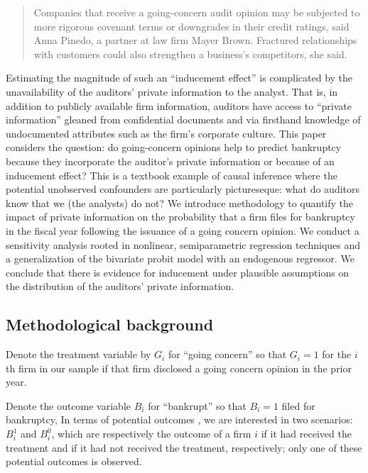 \documentclass[aoas,preprint, 11pt, dvipsnames, table, x11name]{imsart}
\theoremstyle{remark}
\begin{document}
	\begin{quote}
		Companies that receive a going-concern audit opinion may be subjected to more rigorous covenant terms or downgrades in their credit ratings, said Anna Pinedo, a partner at law firm Mayer Brown. Fractured relationships with customers could also strengthen a business’s competitors, she said.
	\end{quote}
	
	Estimating the magnitude of such an ``inducement effect'' is complicated by the unavailability of the auditors' private information to the analyst. That is, in addition to publicly available firm information, auditors have access to ``private information'' gleaned from confidential documents and via firsthand knowledge of undocumented attributes such as the firm's corporate culture. This paper considers the question: do going-concern opinions help to predict bankruptcy because they incorporate the auditor's private information or because of an inducement effect? This is a textbook example of causal inference where the potential unobserved confounders are particularly pictureseque: what do auditors know that we (the analysts) do not? We introduce methodology to quantify the impact of private information on the probability that a firm files for bankruptcy in the fiscal year following the issuance of a going concern opinion.  We conduct a sensitivity analysis rooted in nonlinear, semiparametric regression techniques and a generalization of the bivariate probit model with an endogenous regressor. We conclude that there is evidence for inducement under plausible assumptions on the distribution of the auditors' private information.
	
	
	\subsection{Methodological background}
	
	Denote the treatment variable by $G_i$ for ``going concern'' so that $G_i = 1$ for the $i$th firm in our sample if that firm disclosed a going concern opinion in the prior year. 
	
	Denote the outcome variable $B_i$ for ``bankrupt'' so that $B_i = 1$ filed for bankruptcy, 
	In terms of potential outcomes \citep{rubin}, we are interested in two scenarios: $B^1_i$ and $B^0_i$, which are respectively the outcome of a firm $i$ if it had received the treatment and if it had not received the treatment, respectively; only one of these potential outcomes is observed. 
	
\end{document}
